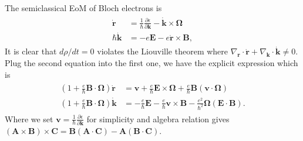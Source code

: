 \documentclass[12pt, oneside]{article}
\newcommand{\pa}{\partial}
\newcommand{\p}[1]{\left(#1\right)}
\numberwithin{equation}{subsection}
\begin{document}
The semiclassical EoM of Bloch electrons is 
\begin{align}
	\begin{split}
		\dot{\bm{r}} &= \frac1\hbar \frac{\pa \epsilon}{\pa \bm{k}} - \dot{\bm{k}} \times \bm{\Omega} \\
		\hbar \dot{\bm{k}} & =  - e \bm{E} - e \dot{\bm{r}} \times \bm{B},
	\end{split}
\end{align}
It is clear that \(d \rho/d t = 0\) violates the Liouville theorem where  \(\nabla_{\bm r}\cdot\dot{\bm r} + \nabla_{\bm k}\cdot\dot{\bm k} \neq 0\). Plug the second equation into the first one, we have the explicit expression which is 
\begin{align}
	\begin{split}
		\p{1 + \frac{e}{\hbar} \bm{B} \cdot \bm{\Omega} } \dot{\bm{r}} & = \bm{v} + \frac{e}{\hbar} \bm{E} \times \bm{\Omega} + \frac{e}{\hbar} \bm{B}\p{\bm{v} \cdot \bm{\Omega}} \\
		 \p{1 + \frac{e}{\hbar}  \bm{B} \cdot \bm{\Omega} } \dot{\bm{k}} & = - \frac{e}{\hbar} \bm{E} - \frac{e}{\hbar} \bm{v} \times \bm{B} - \frac{e^2}{\hbar^2} \bm{\Omega} \p{\bm{E} \cdot \bm{B}}. 
	\end{split}
\end{align}
Where we set \(\bm{v} =  \frac1\hbar \frac{\pa \epsilon}{\pa \bm{k}} \) for simplicity and algebra relation gives \(\p{\bm{A} \times \bm{B}} \times \bm{C} = \bm{B} \p{\bm{A} \cdot \bm{C}} - \bm{A} \p{\bm{B} \cdot \bm{C}}\). 
\end{document}

